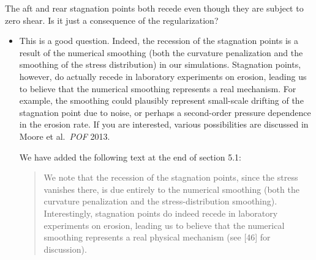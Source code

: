 \documentclass[11pt]{article}
\newcommand{\comment}[1]{{\color{blue} #1}}
\begin{document}
\noindent
\comment{The aft and rear stagnation points both recede even though they
are subject to zero shear. Is it just a consequence of the
regularization?}
\begin{itemize}
\item
This is a good question. Indeed, the recession of the stagnation points is a result of the numerical smoothing (both the curvature penalization and the smoothing of the stress distribution) in our simulations. Stagnation points, however, do actually recede in laboratory experiments on erosion, leading us to believe that the numerical smoothing represents a real mechanism. For example, the smoothing could plausibly represent small-scale drifting of the stagnation point due to noise, or perhaps a second-order pressure dependence in the erosion rate. If you are interested, various possibilities are discussed in Moore et al.~{\it POF} 2013.

We have added the following text at the end of section 5.1:
\begin{quotation}
We note that the recession of the stagnation points, since the stress vanishes there, is due entirely to the numerical smoothing (both the curvature penalization and the stress-distribution smoothing). Interestingly, stagnation points do indeed recede in laboratory experiments on erosion, leading us to believe that the numerical smoothing represents a real physical mechanism (see [46] for discussion).
\end{quotation}

\end{itemize}
\end{document}
